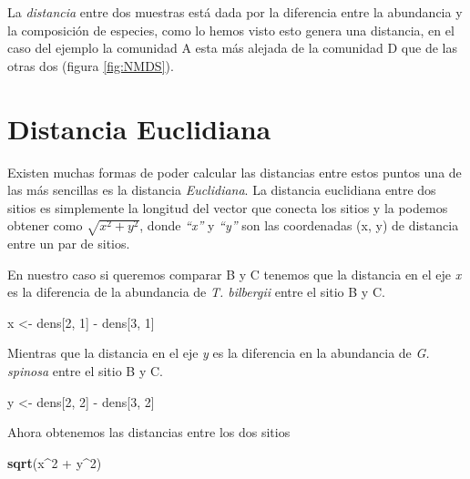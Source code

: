 \documentclass[]{book}
\newenvironment{Shaded}{\begin{snugshade}}{\end{snugshade}}
\newcommand{\KeywordTok}[1]{\textcolor[rgb]{0.13,0.29,0.53}{\textbf{{#1}}}}
\newcommand{\DecValTok}[1]{\textcolor[rgb]{0.00,0.00,0.81}{{#1}}}
\newcommand{\StringTok}[1]{\textcolor[rgb]{0.31,0.60,0.02}{{#1}}}
\newcommand{\NormalTok}[1]{{#1}}
\begin{document}
La \emph{distancia} entre dos muestras está dada por la diferencia entre
la abundancia y la composición de especies, como lo hemos visto esto
genera una distancia, en el caso del ejemplo la comunidad A esta más
alejada de la comunidad D que de las otras dos (figura \ref{fig:NMDS}).

\section{Distancia Euclidiana}\label{distancia-euclidiana}

Existen muchas formas de poder calcular las distancias entre estos
puntos una de las más sencillas es la distancia \emph{Euclidiana}. La
distancia euclidiana entre dos sitios es simplemente la longitud del
vector que conecta los sitios y la podemos obtener como
\(\sqrt{x^2+y^2}\), donde \emph{``x''} y \emph{``y''} son las
coordenadas (x, y) de distancia entre un par de sitios.

En nuestro caso si queremos comparar B y C tenemos que la distancia en
el eje \emph{x} es la diferencia de la abundancia de \emph{T. bilbergii}
entre el sitio B y C.

\begin{Shaded}
\begin{Highlighting}[]
\NormalTok{x <-}\StringTok{ }\NormalTok{dens[}\DecValTok{2}\NormalTok{, }\DecValTok{1}\NormalTok{] -}\StringTok{ }\NormalTok{dens[}\DecValTok{3}\NormalTok{, }\DecValTok{1}\NormalTok{]}
\end{Highlighting}
\end{Shaded}

Mientras que la distancia en el eje \emph{y} es la diferencia en la
abundancia de \emph{G. spinosa} entre el sitio B y C.

\begin{Shaded}
\begin{Highlighting}[]
\NormalTok{y <-}\StringTok{ }\NormalTok{dens[}\DecValTok{2}\NormalTok{, }\DecValTok{2}\NormalTok{] -}\StringTok{ }\NormalTok{dens[}\DecValTok{3}\NormalTok{, }\DecValTok{2}\NormalTok{]}
\end{Highlighting}
\end{Shaded}

Ahora obtenemos las distancias entre los dos sitios

\begin{Shaded}
\begin{Highlighting}[]
\KeywordTok{sqrt}\NormalTok{(x^}\DecValTok{2} \NormalTok{+}\StringTok{ }\NormalTok{y^}\DecValTok{2}\NormalTok{)}
\end{Highlighting}
\end{Shaded}
\end{document}
